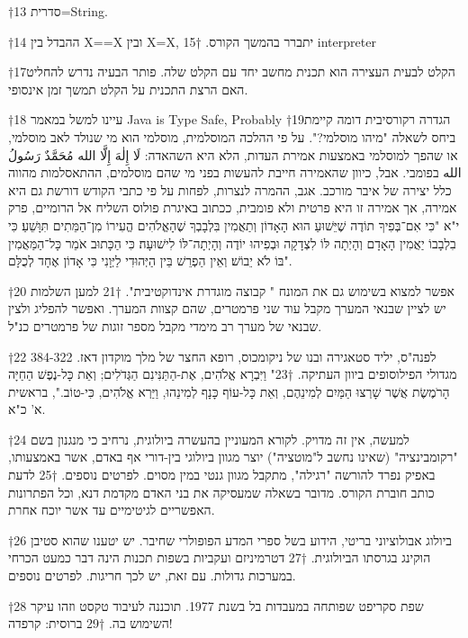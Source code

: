 †{13} סדרית=String.

†{14} ההבדל בין X==X ובין X=X, יתברר בהמשך הקורס.
†{15} interpreter

†{17}הקלט לבעית העצירה הוא תכנית מחשב יחד עם הקלט שלה. פותר הבעיה נדרש להחליט האם הרצת התכנית על הקלט תמשך זמן אינסופי.

†{18} עיינו למשל במאמר Java is Type Safe, Probably
†{19}הגדרה רקורסיבית דומה קיימת ביחס לשאלה "מיהו מוסלמי?". על פי ההלכה המוסלמית, מוסלמי הוא מי שנולד לאב מוסלמי, או שהפך למוסלמי באמצעות אמירת העדות, הלא היא השהאדה: لَا إِلٰهَ إِلَّا الله مُحَمَّدٌ رَسُولُ الله בפומבי. אבל, כיוון שהאמירה חייבת להעשות בפני מי שהם מוסלמים, ההתאסלמות מהווה כלל יצירה של איבר מורכב. אגב, ההמרה לנצרות, לפחות על פי כתבי הקודש דורשת גם היא אמירה, אך אמירה זו היא פרטית ולא פומבית, ככתוב באיגרת פולוס השליח אל הרומיים, פרק י"א "כִּי אִם־בְּפִיךָ תוֹדֶה שֶׁיֵּשׁוּעַ הוּא הָאָדוֹן וְתַאֲמִין בִּלְבָבְךָ שֶׁהָאֱלֹהִים הֱעִירוֹ מִן־הַמֵּתִים תִּוָּשֵׁעַ׃ כִּי בִלְבָבוֹ יַאֲמִין הָאָדָם וְהָיְתָה לּוֹ לִצְדָקָה וּבְפִיהוּ יוֹדֶה וְהָיְתָה־לּוֹ לִישׁוּעָה׃ כִּי הַכָּתוּב אֹמֵר כָּל־הַמַּאֲמִין בּוֹ לֹא יֵבוֹשׁ׃ וְאֵין הַפְרֵשׁ בֵּין הַיְּהוּדִי לַיְּוָנִי כִּי אָדוֹן אֶחָד לְכֻלָּם".

†{20} אפשר למצוא בשימוש גם את המונח " קבוצה מוגדרת אינדוקטיבית".
†{21} למען השלמות יש לציין שבנאי המערך מקבל עוד שני פרמטרים, שהם קצוות המערך. ואפשר להפליג ולצין שבנאי של מערך רב מימדי מקבל מספר זוגות של פרמטרים כנ"ל.

†{22} 384-322 לפנה"ס, יליד סטאגירה ובנו של ניקומכוס, רופא החצר של מלך מוקדון דאז. מגדולי הפילוסופים ביוון העתיקה.
†{23}" וַיִּבְרָא אֱלֹהִים, אֶת-הַתַּנִּינִם הַגְּדֹלִים; וְאֵת כָּל-נֶפֶשׁ הַחַיָּה הָרֹמֶשֶׂת אֲשֶׁר שָׁרְצוּ הַמַּיִם לְמִינֵהֶם, וְאֵת כָּל-עוֹף כָּנָף לְמִינֵהוּ, וַיַּרְא אֱלֹהִים, כִּי-טוֹב.", בראשית א' כ"א.

†{24} למעשה, אין זה מדויק. לקורא המעוניין בהעשרה ביולוגית, נרחיב כי מנגנון בשם "רקומבינציה" (שאינו נחשב ל"מוטציה") יוצר מגוון ביולוגי בין-דורי אף באדם, אשר באמצעותו, באפיק נפרד להורשה "רגילה", מתקבל מגוון גנטי במין מסוים. לפרטים נוספים.
†{25} לדעת כותב חוברת הקורס. מדובר בשאלה שמעסיקה את בני האדם מקדמת דנא, וכל הפתרונות האפשריים לגיטימיים עד אשר יוכח אחרת.

†{26} ביולוג אבולוציוני בריטי, הידוע בשל ספרי המדע הפופולרי שחיבר. יש יטענו שהוא סטיבן הוקינג בגרסתו הביולוגית.
†{27} דטרמיניזם ועקביות בשפות תכנות הינה דבר כמעט הכרחי במערכות גדולות. עם זאת, יש לכך חריגות. לפרטים נוספים.

†{28} שפת סקריפט שפותחה במעבדות בל בשנת 1977. תוכננה לעיבוד טקסט וזהו עיקר השימוש בה.
†{29} ברוסית: קרפדה!

